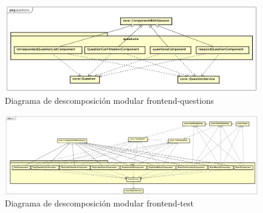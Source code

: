 \documentclass[openright,twoside,10pt]{book}
\begin{document}
    \vspace*{\fill} \newpage
    
    \vspace*{\fill}
    
    \begin{figure}[H]
        \begin{center}
            \includegraphics[width=\textwidth, angle=-90]{img/astah/disenio/descomposicion/front/questions.png}
        \end{center}
        \caption{Diagrama de descomposición modular frontend-questions}
    \end{figure}
    
    \vspace*{\fill} \newpage
    
    \vspace*{\fill}
    
    \begin{figure}[H]
        \begin{center}
            \includegraphics[width=\textwidth, angle=-90]{img/astah/disenio/descomposicion/front/test.png}
        \end{center}
        \caption{Diagrama de descomposición modular frontend-test}
    \end{figure}
    
    \vspace*{\fill} \newpage
    
    \vspace*{\fill}
    
\end{document}
